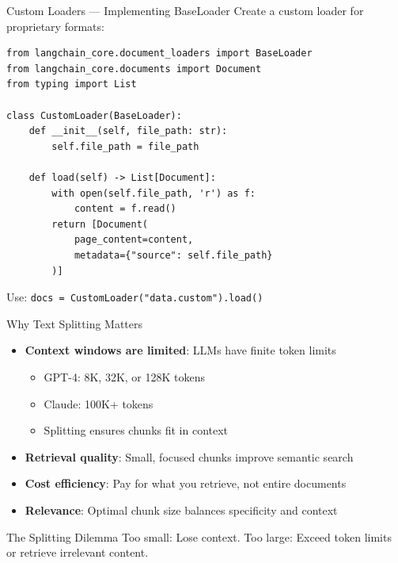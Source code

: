 \documentclass[aspectratio=169,11pt]{beamer}
\begin{document}
\begin{frame}[fragile]{Custom Loaders --- Implementing BaseLoader}
  Create a custom loader for proprietary formats:
  \begin{lstlisting}
from langchain_core.document_loaders import BaseLoader
from langchain_core.documents import Document
from typing import List

class CustomLoader(BaseLoader):
    def __init__(self, file_path: str):
        self.file_path = file_path

    def load(self) -> List[Document]:
        with open(self.file_path, 'r') as f:
            content = f.read()
        return [Document(
            page_content=content,
            metadata={"source": self.file_path}
        )]
  \end{lstlisting}

  \vspace{0.5cm}
  Use: \texttt{docs = CustomLoader("data.custom").load()}
\end{frame}

\begin{frame}{Why Text Splitting Matters}
  \begin{itemize}
    \setlength{\itemsep}{1pt}
    \item \textbf{Context windows are limited}: LLMs have finite token limits
    \begin{itemize}
    \setlength{\itemsep}{1pt}
      \item GPT-4: 8K, 32K, or 128K tokens
      \item Claude: 100K+ tokens
      \item Splitting ensures chunks fit in context
    \end{itemize}
    \item \textbf{Retrieval quality}: Small, focused chunks improve semantic search
    \item \textbf{Cost efficiency}: Pay for what you retrieve, not entire documents
    \item \textbf{Relevance}: Optimal chunk size balances specificity and context
  \end{itemize}

  \vspace{1cm}
  \begin{warningbox}{The Splitting Dilemma}
    Too small: Lose context. Too large: Exceed token limits or retrieve irrelevant content.
  \end{warningbox}
\end{frame}
\end{document}
